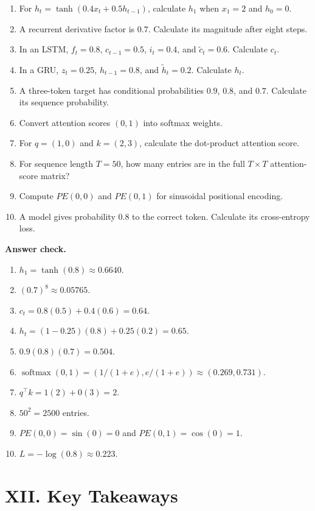 \documentclass[11pt,a4paper,twoside]{article}
\newcommand{\softmax}{\operatorname{softmax}}
\begin{document}
\begin{enumerate}
  \item For $h_t=\tanh(0.4x_t+0.5h_{t-1})$, calculate $h_1$ when $x_1=2$ and $h_0=0$.
  \item A recurrent derivative factor is $0.7$. Calculate its magnitude after eight steps.
  \item In an LSTM, $f_t=0.8$, $c_{t-1}=0.5$, $i_t=0.4$, and $\tilde c_t=0.6$. Calculate $c_t$.
  \item In a GRU, $z_t=0.25$, $h_{t-1}=0.8$, and $\tilde h_t=0.2$. Calculate $h_t$.
  \item A three-token target has conditional probabilities $0.9$, $0.8$, and $0.7$. Calculate its sequence probability.
  \item Convert attention scores $(0,1)$ into softmax weights.
  \item For $q=(1,0)$ and $k=(2,3)$, calculate the dot-product attention score.
  \item For sequence length $T=50$, how many entries are in the full $T\times T$ attention-score matrix?
  \item Compute $PE(0,0)$ and $PE(0,1)$ for sinusoidal positional encoding.
  \item A model gives probability $0.8$ to the correct token. Calculate its cross-entropy loss.
\end{enumerate}

\textbf{Answer check.}

\begin{enumerate}
  \item $h_1=\tanh(0.8)\approx0.6640$.
  \item $(0.7)^8\approx0.05765$.
  \item $c_t=0.8(0.5)+0.4(0.6)=0.64$.
  \item $h_t=(1-0.25)(0.8)+0.25(0.2)=0.65$.
  \item $0.9(0.8)(0.7)=0.504$.
  \item $\softmax(0,1)=(1/(1+e),e/(1+e))\approx(0.269,0.731)$.
  \item $q^\top k=1(2)+0(3)=2$.
  \item $50^2=2500$ entries.
  \item $PE(0,0)=\sin(0)=0$ and $PE(0,1)=\cos(0)=1$.
  \item $L=-\log(0.8)\approx0.223$.
\end{enumerate}

\section*{XII. Key Takeaways}
\end{document}
